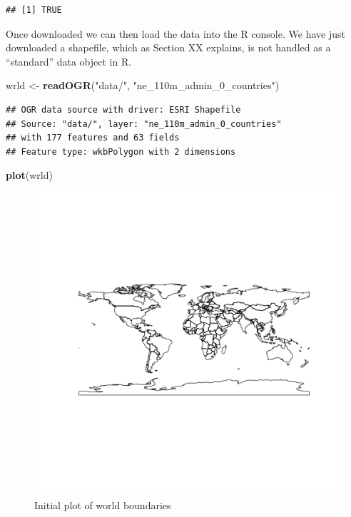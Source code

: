 \documentclass[]{article}
\makeatletter
\newenvironment{Shaded}{}{}
\newcommand{\KeywordTok}[1]{\textcolor[rgb]{0.00,0.44,0.13}{\textbf{{#1}}}}
\newcommand{\StringTok}[1]{\textcolor[rgb]{0.25,0.44,0.63}{{#1}}}
\newcommand{\NormalTok}[1]{{#1}}
\def\maxwidth{\ifdim\Gin@nat@width>\linewidth\linewidth
\else\Gin@nat@width\fi}
\let\Oldincludegraphics\includegraphics
\renewcommand{\includegraphics}[1]{\Oldincludegraphics[width=\maxwidth]{#1}}
\makeatother
\begin{document}
\begin{verbatim}
## [1] TRUE
\end{verbatim}

Once downloaded we can then load the data into the R console. We have
just downloaded a shapefile, which as Section XX explains, is not
handled as a ``standard'' data object in R.

\begin{Shaded}
\begin{Highlighting}[]
\NormalTok{wrld <-}\StringTok{ }\KeywordTok{readOGR}\NormalTok{(}\StringTok{"data/"}\NormalTok{, }\StringTok{"ne_110m_admin_0_countries"}\NormalTok{)}
\end{Highlighting}
\end{Shaded}

\begin{verbatim}
## OGR data source with driver: ESRI Shapefile 
## Source: "data/", layer: "ne_110m_admin_0_countries"
## with 177 features and 63 fields
## Feature type: wkbPolygon with 2 dimensions
\end{verbatim}

\begin{Shaded}
\begin{Highlighting}[]
\KeywordTok{plot}\NormalTok{(wrld)}
\end{Highlighting}
\end{Shaded}

\begin{figure}[htbp]
\centering
\includegraphics{figure/Initial_plot_of_world_boundaries.png}
\caption{Initial plot of world boundaries}
\end{figure}
\end{document}
